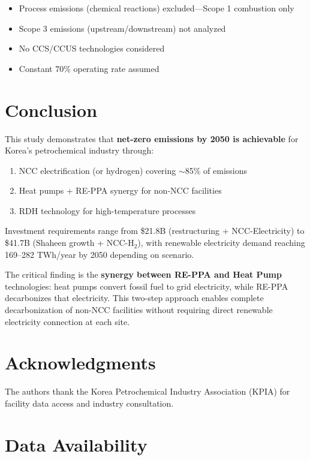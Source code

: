 \documentclass[12pt,a4paper]{article}
\begin{document}
\begin{itemize}
    \item Process emissions (chemical reactions) excluded---Scope 1 combustion only
    \item Scope 3 emissions (upstream/downstream) not analyzed
    \item No CCS/CCUS technologies considered
    \item Constant 70\% operating rate assumed
\end{itemize}

\section{Conclusion}

This study demonstrates that \textbf{net-zero emissions by 2050 is achievable} for Korea's petrochemical industry through:
\begin{enumerate}
    \item NCC electrification (or hydrogen) covering $\sim$85\% of emissions
    \item Heat pumps + RE-PPA synergy for non-NCC facilities
    \item RDH technology for high-temperature processes
\end{enumerate}

Investment requirements range from \$21.8B (restructuring + NCC-Electricity) to \$41.7B (Shaheen growth + NCC-H$_2$), with renewable electricity demand reaching 169--282 TWh/year by 2050 depending on scenario.

The critical finding is the \textbf{synergy between RE-PPA and Heat Pump} technologies: heat pumps convert fossil fuel to grid electricity, while RE-PPA decarbonizes that electricity. This two-step approach enables complete decarbonization of non-NCC facilities without requiring direct renewable electricity connection at each site.

\section*{Acknowledgments}

The authors thank the Korea Petrochemical Industry Association (KPIA) for facility data access and industry consultation.

\section*{Data Availability}
\end{document}
